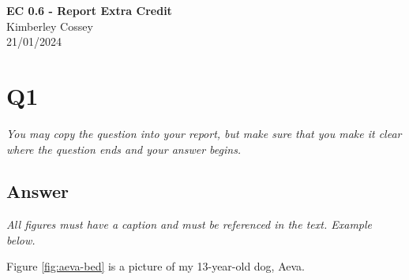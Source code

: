 \documentclass[12pt]{article}
\begin{document}
\begin{centering}
{\large\textbf{EC 0.6 - Report Extra Credit}}\\ 
Kimberley Cossey\\
21/01/2024\\
\end{centering}


\section*{Q1}

\emph{You may copy the question into your report, but make sure that you make it clear where the question ends and your answer begins.}

\subsection*{Answer}

\emph{All figures must have a caption and must be referenced in the text. Example below.}

Figure \ref{fig:aeva-bed} is a picture of my 13-year-old dog, Aeva.
\end{document}
